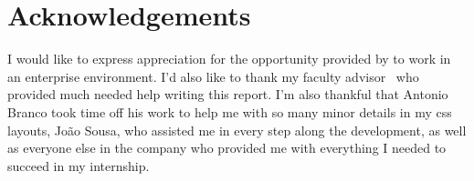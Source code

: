 


% 
% 
% 

\begingroup
\let\clearpage\relax
\let\cleardoublepage\relax
\let\cleardoublepage\relax
\chapter*{Acknowledgements}

I would like to express appreciation for the opportunity provided by \company to work
in an enterprise environment. I'd also like to thank my faculty advisor \myProf\ 
who provided much needed help writing this report. I'm also thankful that 
Antonio Branco took time off his work to help me with so many minor details in my \acrshort{css}
layouts, João Sousa, who assisted me in every step along the development, as well as everyone
else in the company who provided me with everything I needed to succeed in my internship.\\



\endgroup




